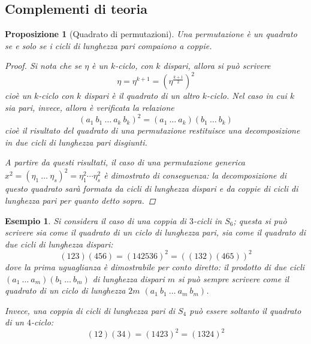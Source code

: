 \documentclass[12pt]{scrartcl}
\theoremstyle{style}
\newtheorem{esempio}{Esempio}[section]
\newtheorem{prop}{Proposizione}[section]
\numberwithin{equation}{subsection}
\begin{document}
\subsection{Complementi di teoria}
\begin{prop}[Quadrato di permutazioni]\label{qperm}
	Una permutazione \`e un quadrato se e solo se i cicli di lunghezza pari compaiono a coppie.
	\begin{proof}
		Si nota che se $\eta$ \`e un $k$-ciclo, con $k$ dispari, allora si pu\`o scrivere
		\[
		\eta = \eta^{k+1} = \left(\eta^{\frac{k+1}{2}}\right) ^2
		\] 
		cio\`e un $k$-ciclo con $k$ dispari \`e il quadrato di un altro $k$-ciclo.
		Nel caso in cui $k$ sia pari, invece, allora \`e verificata la relazione
		\[
			(a_1 \ b_1 \ \ldots \ a_k\ b_k)^2 = (a_1\ \ldots\ a_k) (b_1\ \ldots \ b_k)
		\] 
	cio\`e il risultato del quadrato di una permutazione restituisce una decomposizione in due cicli di lunghezza pari disgiunti.	

	A partire da questi risultati, il caso di una permutazione generica $x^2= (\eta_1 \ \ldots\ \eta_s)^2=\eta_1^2 \cdots \eta_s^2$ \`e dimostrato di conseguenza: la decomposizione di questo quadrato sar\`a formata da cicli di lunghezza dispari e da coppie di cicli di lunghezza pari per quanto detto sopra.
\end{proof}
\end{prop}
\begin{esempio}
Si considera il caso di una coppia di $3$-cicli in $S_6$; questa si pu\`o scrivere sia come il quadrato di un ciclo di lunghezza pari, sia come il quadrato di due cicli di lunghezza dispari:
\[
	(123)(456) = (142536)^2 = ((132)(465))^2
\] 
dove la prima uguaglianza \`e dimostrabile per conto diretto: il prodotto di due cicli $(a_1\ \ldots\ a_m)(b_1\ \ldots\ b_m)$ di lunghezza dispari $m$ si pu\`o sempre scrivere come il quadrato di un ciclo di lunghezza $2m$ $(a_1\ b_1\ \ldots\ a_m\ b_m)$.

Invece, una coppia di cicli di lunghezza pari di $S_4$ pu\`o essere soltanto il quadrato di un $4$-ciclo:
\[
	(12)(34) = (1423)^2 = (1324)^2
\] 

\end{esempio}
\end{document}
